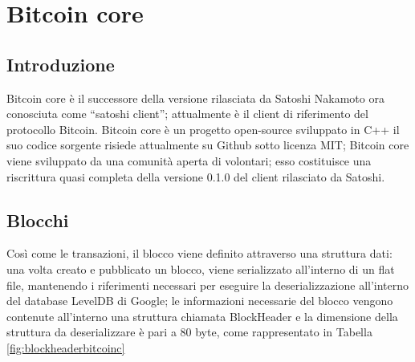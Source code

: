 \chapter{Bitcoin core}
\label{chap:bitcoin core}

\section{Introduzione}
\label{sec:introduzionebitcoincore}

Bitcoin core è il successore della versione rilasciata da Satoshi Nakamoto ora conosciuta come “satoshi client”; attualmente è il client di riferimento del protocollo Bitcoin.
Bitcoin core è un progetto open-source sviluppato in C++ il suo codice sorgente risiede attualmente su Github sotto licenza MIT; Bitcoin core viene sviluppato da una comunità aperta di volontari; esso costituisce una riscrittura quasi completa della versione 0.1.0 del client rilasciato da Satoshi.

\section{Blocchi}
\label{sec:blocchibitcoincore}

Così come le transazioni, il blocco viene definito attraverso una struttura dati: una volta creato e pubblicato un blocco, viene serializzato all’interno di un flat file, mantenendo i riferimenti necessari per eseguire la deserializzazione all’interno del database LevelDB di Google; le informazioni necessarie del blocco vengono contenute all’interno una struttura chiamata BlockHeader e la dimensione della struttura da deserializzare è pari a 80 byte, come rappresentato in Tabella \ref{fig:blockheaderbitcoinc}


